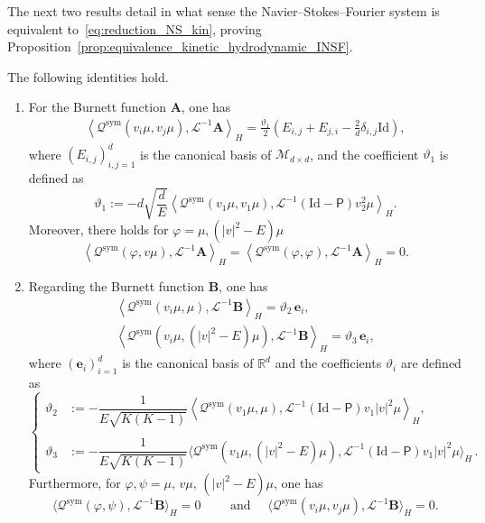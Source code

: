\documentclass[AHL,Unicode,longabstracts,published]{cedram}
\newcommand{\sym}{\mathrm{sym}}
\newcommand{\Id}{\mathrm{Id}}
\newcommand{\BurA}{{\mathbf{A}}}
\newcommand{\BurB}{{\mathbf{B}}}
\newcommand{\Bure}{\mathbf{e}}
\newcommand{\R}{\mathbb{R}}
\newcommand{\LL}{\mathcal{L}}
\newcommand{\PP}{\mathsf{P}}
\newcommand{\QQ}{\mathcal{Q}}
\newcommand{\MMM}{\mathscr{M}}
\newcommand{\Ss}{H}
\newcommand{\la}{\langle}
\newcommand{\ra}{\rangle}
\begin{document}
The next two results detail in what sense the Navier--Stokes--Fourier system is equivalent to~\eqref{eq:reduction_NS_kin}, proving Proposition~\ref{prop:equivalence_kinetic_hydrodynamic_INSF}.
\begin{lemm}
The following identities hold.\label{lem:Q_A}
\begin{enumerate}
\item For the Burnett function $\BurA $, one has
\begin{gather*}
\left\la \QQ^\sym\left(v_i \mu, v_j \mu\right), \LL^{-1}\BurA \right\ra_{\Ss} = \frac{\vartheta_1}{2} \left(E_{i, j} + E_{j, i} - \frac{2}{d} \delta_{i, j} \Id \right),
\end{gather*}
where $(E_{i, j})_{i, j = 1}^d$ is the canonical basis of $\MMM_{d\times d}$, and the coefficient $\vartheta_1$ is defined as
\begin{equation*}
\vartheta_1 := - d \sqrt{ \dfrac{d}{E} } \left\la \QQ^\sym(v_1 \mu, v_1 \mu), \LL^{-1} \left(\Id - \PP \right) v_2^2 \mu \right\ra_{\Ss}.
\end{equation*}
Moreover, there holds for $\varphi = \mu, (|v|^2-E) \mu$
\begin{equation*}
\left\la \QQ^\sym(\varphi, v \mu), \LL^{-1}\BurA \right\ra_{\Ss} = \left\la \QQ^\sym(\varphi, \varphi), \LL^{-1}\BurA \right\ra_{\Ss} = 0.
\end{equation*}
\item Regarding the Burnett function $\BurB $, one has
\begin{gather*}
\left\la \QQ^\sym(v_i \mu, \mu), \LL^{-1}\BurB \right\ra_{\Ss} = \vartheta_2 \, \Bure_i, \\
\left\la \QQ^\sym(v_i \mu, \left(|v|^2 - E \right) \mu), \LL^{-1}\BurB \right\ra_{\Ss} = \vartheta_3 \, \Bure_i,
\end{gather*}
where $(\bm{e}_i)_{i=1}^d$ is the canonical basis of $\R^d$ and the coefficients $\vartheta_i$ are defined as
\begin{equation*}
\begin{cases}
\vartheta_2 &:= - \dfrac{1}{E \sqrt{K (K-1)}} \left\la \QQ^\sym(v_1 \mu, \mu), \LL^{-1} \left(\Id - \PP \right) v_1 |v|^2 \mu \right\ra_{\Ss},\\
\\
\vartheta_3 &:= - \dfrac{1}{E \sqrt{K (K-1)}} \big\la \QQ^\sym(v_1 \mu, \left(|v|^2 - E \right) \mu), \LL^{-1} \left(\Id - \PP \right) v_1 |v|^2 \mu \big\ra_{\Ss}\,.
\end{cases}
\end{equation*}
Furthermore, for $\varphi, \psi = \mu, \, v \mu, \, \left(|v|^2 - E \right) \mu$, one has
\begin{equation*}
\big\la \QQ^\sym(\varphi, \psi), \LL^{-1}\BurB \big\ra_{\Ss} = 0 \qquad \text{ and } \quad
\big\la \QQ^\sym(v_i \mu, v_j \mu), \LL^{-1}\BurB \big\ra_{\Ss} = 0.
\end{equation*}
\end{enumerate}
\end{lemm}
\end{document}
